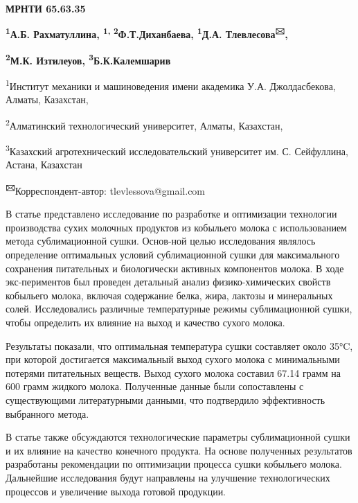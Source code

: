 \newpage
{\bfseries МРНТИ 65.63.35}

\begin{center}
{\bfseries \textsuperscript{1}А.Б. Рахматуллина, \textsuperscript{1,
2}Ф.Т.Диханбаева, \textsuperscript{1}Д.А. Тлевлесова\textsuperscript{🖂}, }

{\bfseries \textsuperscript{2}М.К. Изтилеуов, \textsuperscript{3}Б.К.Калемшарив}




\textsuperscript{1}Институт механики и машиноведения имени академика
У.А. Джолдасбекова, Алматы, Казахстан,

\textsuperscript{2}Алматинский технологический университет, Алматы,
Казахстан,

\textsuperscript{3}Казахский агротехнический исследовательский
университет им. С. Сейфуллина, Астана, Казахстан
\end{center}

{\bfseries \textsuperscript{🖂}}Корреспондент-автор: tlevlessova@gmail.com\vspace{0.5cm}

В статье представлено исследование по разработке и оптимизации
технологии производства сухих молочных продуктов из кобыльего молока с
использованием метода сублимационной сушки. Основ-ной целью исследования
являлось определение оптимальных условий сублимационной сушки для
максимального сохранения питательных и биологически активных компонентов
молока. В ходе экс-периментов был проведен детальный анализ
физико-химических свойств кобыльего молока, включая содержание белка,
жира, лактозы и минеральных солей. Исследовались различные температурные
режимы сублимационной сушки, чтобы определить их влияние на выход и
качество сухого молока.

Результаты показали, что оптимальная температура сушки составляет около
35°C, при которой достигается максимальный выход сухого молока с
минимальными потерями питательных веществ. Выход сухого молока составил
67.14 грамм на 600 грамм жидкого молока. Полученные данные были
сопоставлены с существующими литературными данными, что подтвердило
эффективность выбранного метода.

В статье также обсуждаются технологические параметры сублимационной
сушки и их влияние на качество конечного продукта. На основе полученных
результатов разработаны рекомендации по оптимизации процесса сушки
кобыльего молока. Дальнейшие исследования будут направлены на улучшение
технологических процессов и увеличение выхода готовой продукции.

